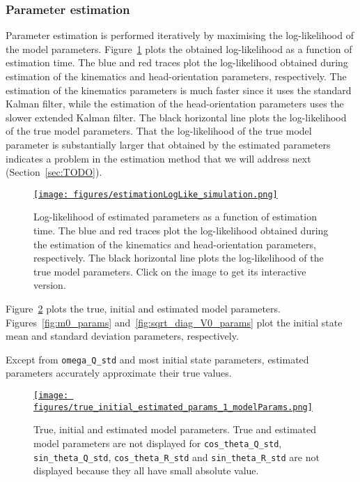 \documentclass[12pt]{article}
\begin{document}
\subsubsection*{Parameter estimation}

Parameter estimation is performed iteratively by maximising the log-likelihood
of the model parameters. Figure~\ref{fig:sim_logLike} plots the obtained
log-likelihood as a function of estimation time. The blue and red traces plot the
log-likelihood obtained during estimation of the kinematics and
head-orientation parameters, respectively.
%
The estimation of the kinematics parameters is much faster since it uses the
standard Kalman filter, while the estimation of the head-orientation parameters
uses the slower extended Kalman filter. The black horizontal line plots the
log-likelihood of the true model parameters.
%
That the log-likelihood of the true model parameter is substantially larger
that obtained by the estimated parameters indicates a problem in the estimation
method that we will address next (Section~\ref{sec:TODO}).

\begin{figure}
    \centering
    \href{https://www.gatsby.ucl.ac.uk/~rapela/aman/reports/ekfForKinematicsAndHeadOrientation/figures/estimationLogLike_simulation.html}{\texttt{[image: figures/estimationLogLike\_simulation.png]}}
    \caption{Log-likelihood of estimated parameters as a function of estimation
    time. The blue and red traces plot the log-likelihood obtained during the
    estimation of the kinematics and head-orientation parameters, respectively.
    The black horizontal line plots the log-likelihood of the true model
    parameters. Click on the image to get its interactive version.}
    \label{fig:sim_logLike}
\end{figure}

Figure~\ref{fig:model_params} plots the true, initial and estimated model
parameters. Figures~\ref{fig:m0_params}
and~\ref{fig:sqrt_diag_V0_params} plot the initial
state mean and standard deviation parameters, respectively.

Except from \texttt{omega\_Q\_std} and most initial state parameters, estimated
parameters accurately approximate their true values.

\begin{figure}
    \centering
    \href{https://www.gatsby.ucl.ac.uk/~rapela/aman/reports/ekfForKinematicsAndHeadOrientation/figures/true_initial_estimated_params_1_modelParams.html}{\texttt{[image: figures/true\_initial\_estimated\_params\_1\_modelParams.png]}}

    \caption{True, initial and estimated model parameters.  True and estimated
    model parameters are not displayed for \texttt{cos\_theta\_Q\_std},
    \texttt{sin\_theta\_Q\_std}, \texttt{cos\_theta\_R\_std} and
    \texttt{sin\_theta\_R\_std} are not displayed because they all have small
    absolute value.}

    \label{fig:model_params}
\end{figure}
\end{document}

